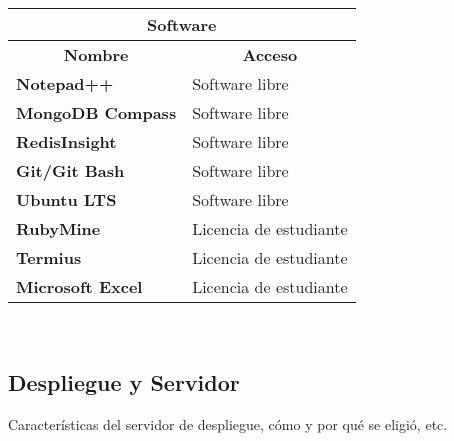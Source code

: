 \begin{center}
	\begin{tabular}{ | l | p{10cm} |}
		\hline
		\multicolumn{2}{|c|}{\textbf{Software}} \\
		\hline
		\multicolumn{1}{|c|}{\textbf{Nombre}} & \multicolumn{1}{|c|}{\textbf{Acceso}} \\
		\hline
		
		{\textbf{Notepad++}} & Software libre \\ \hline
		
		{\textbf{MongoDB Compass}} & Software libre \\ \hline
		
		{\textbf{RedisInsight}} & Software libre \\ \hline
		
		{\textbf{Git/Git Bash}} & Software libre \\ \hline
		
		{\textbf{Ubuntu LTS}} & Software libre \\ \hline
		
		{\textbf{RubyMine}} & Licencia de estudiante \\ \hline
		
		{\textbf{Termius}} & Licencia de estudiante \\ \hline
		
		{\textbf{Microsoft  Excel}} & Licencia de estudiante \\ \hline
	\end{tabular}
  \\
  \label{table:software}
\end{center}

\subsection{Despliegue y Servidor}
Características del servidor de despliegue, cómo y por qué se eligió, etc.

